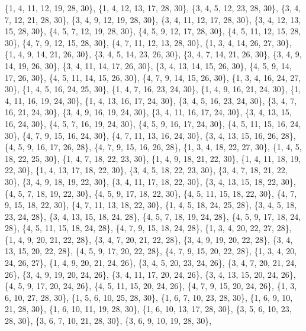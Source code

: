 \documentclass[11pt,a4paper]{article}
\begin{document}
{\{1, 4, 11, 12, 19, 28, 30\}, \{1, 4, 12, 13, 17, 28, 30\}, \{3, 4, 5, 12, 23, 28, 30\}, \{3, 4, 7, 12, 21, 28, 30\}, \{3, 4, 9, 12, 19, 28, 30\},
\{3, 4, 11, 12, 17, 28, 30\}, \{3, 4, 12, 13, 15, 28, 30\}, \{4, 5, 7, 12, 19, 28, 30\}, \{4, 5, 9, 12, 17, 28, 30\}, \{4, 5, 11, 12, 15, 28, 30\},
\{4, 7, 9, 12, 15, 28, 30\}, \{4, 7, 11, 12, 13, 28, 30\}, \{1, 3, 4, 14, 26, 27, 30\}, \{1, 4, 9, 14, 21, 26, 30\}, \{3, 4, 5, 14, 23, 26, 30\},
\{3, 4, 7, 14, 21, 26, 30\}, \{3, 4, 9, 14, 19, 26, 30\}, \{3, 4, 11, 14, 17, 26, 30\}, \{3, 4, 13, 14, 15, 26, 30\}, \{4, 5, 9, 14, 17, 26, 30\},
\{4, 5, 11, 14, 15, 26, 30\}, \{4, 7, 9, 14, 15, 26, 30\}, \{1, 3, 4, 16, 24, 27, 30\}, \{1, 4, 5, 16, 24, 25, 30\}, \{1, 4, 7, 16, 23, 24, 30\},
\{1, 4, 9, 16, 21, 24, 30\}, \{1, 4, 11, 16, 19, 24, 30\}, \{1, 4, 13, 16, 17, 24, 30\}, \{3, 4, 5, 16, 23, 24, 30\}, \{3, 4, 7, 16, 21, 24, 30\},
\{3, 4, 9, 16, 19, 24, 30\}, \{3, 4, 11, 16, 17, 24, 30\}, \{3, 4, 13, 15, 16, 24, 30\}, \{4, 5, 7, 16, 19, 24, 30\}, \{4, 5, 9, 16, 17, 24, 30\},
\{4, 5, 11, 15, 16, 24, 30\}, \{4, 7, 9, 15, 16, 24, 30\}, \{4, 7, 11, 13, 16, 24, 30\}, \{3, 4, 13, 15, 16, 26, 28\}, \{4, 5, 9, 16, 17, 26, 28\},
\{4, 7, 9, 15, 16, 26, 28\}, \{1, 3, 4, 18, 22, 27, 30\}, \{1, 4, 5, 18, 22, 25, 30\}, \{1, 4, 7, 18, 22, 23, 30\}, \{1, 4, 9, 18, 21, 22, 30\},
\{1, 4, 11, 18, 19, 22, 30\}, \{1, 4, 13, 17, 18, 22, 30\}, \{3, 4, 5, 18, 22, 23, 30\}, \{3, 4, 7, 18, 21, 22, 30\}, \{3, 4, 9, 18, 19, 22, 30\},
\{3, 4, 11, 17, 18, 22, 30\}, \{3, 4, 13, 15, 18, 22, 30\}, \{4, 5, 7, 18, 19, 22, 30\}, \{4, 5, 9, 17, 18, 22, 30\}, \{4, 5, 11, 15, 18, 22, 30\},
\{4, 7, 9, 15, 18, 22, 30\}, \{4, 7, 11, 13, 18, 22, 30\}, \{1, 4, 5, 18, 24, 25, 28\}, \{3, 4, 5, 18, 23, 24, 28\}, \{3, 4, 13, 15, 18, 24, 28\},
\{4, 5, 7, 18, 19, 24, 28\}, \{4, 5, 9, 17, 18, 24, 28\}, \{4, 5, 11, 15, 18, 24, 28\}, \{4, 7, 9, 15, 18, 24, 28\}, \{1, 3, 4, 20, 22, 27, 28\},
\{1, 4, 9, 20, 21, 22, 28\}, \{3, 4, 7, 20, 21, 22, 28\}, \{3, 4, 9, 19, 20, 22, 28\}, \{3, 4, 13, 15, 20, 22, 28\}, \{4, 5, 9, 17, 20, 22, 28\},
\{4, 7, 9, 15, 20, 22, 28\}, \{1, 3, 4, 20, 24, 26, 27\}, \{1, 4, 9, 20, 21, 24, 26\}, \{3, 4, 5, 20, 23, 24, 26\}, \{3, 4, 7, 20, 21, 24, 26\},
\{3, 4, 9, 19, 20, 24, 26\}, \{3, 4, 11, 17, 20, 24, 26\}, \{3, 4, 13, 15, 20, 24, 26\}, \{4, 5, 9, 17, 20, 24, 26\}, \{4, 5, 11, 15, 20, 24, 26\},
\{4, 7, 9, 15, 20, 24, 26\}, \{1, 3, 6, 10, 27, 28, 30\}, \{1, 5, 6, 10, 25, 28, 30\}, \{1, 6, 7, 10, 23, 28, 30\}, \{1, 6, 9, 10, 21, 28, 30\},
\{1, 6, 10, 11, 19, 28, 30\}, \{1, 6, 10, 13, 17, 28, 30\}, \{3, 5, 6, 10, 23, 28, 30\}, \{3, 6, 7, 10, 21, 28, 30\}, \{3, 6, 9, 10, 19, 28, 30\},
}
\end{document}
